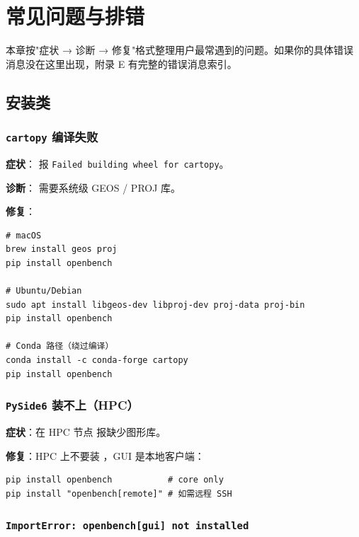 
\chapter{常见问题与排错}

本章按"症状 → 诊断 → 修复"格式整理用户最常遇到的问题。如果你的具体错误消息没在这里出现，附录 E 有完整的错误消息索引。

\section{安装类}

\subsection{\texttt{cartopy} 编译失败}

\textbf{症状}： 报 \texttt{Failed building wheel for cartopy}。

\textbf{诊断}： 需要系统级 GEOS / PROJ 库。

\textbf{修复}：

\begin{verbatim}
# macOS
brew install geos proj
pip install openbench

# Ubuntu/Debian
sudo apt install libgeos-dev libproj-dev proj-data proj-bin
pip install openbench

# Conda 路径（绕过编译）
conda install -c conda-forge cartopy
pip install openbench
\end{verbatim}

\subsection{\texttt{PySide6} 装不上（HPC）}

\textbf{症状}：在 HPC 节点  报缺少图形库。

\textbf{修复}：HPC 上不要装 \cli{[gui]}，GUI 是本地客户端：

\begin{verbatim}
pip install openbench           # core only
pip install "openbench[remote]" # 如需远程 SSH
\end{verbatim}

\subsection{\texttt{ImportError: openbench[gui] not installed}}


